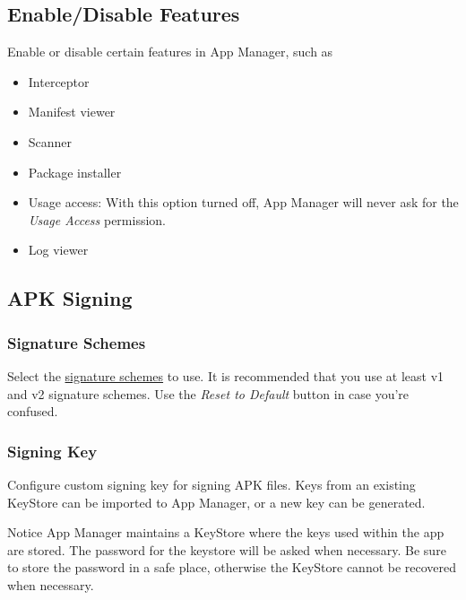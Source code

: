 \subsection{Enable/Disable Features}\label{subsec:enable/disable-features} %
Enable or disable certain features in App Manager, such as
\begin{itemize}
    \item Interceptor
    \item Manifest viewer
    \item Scanner
    \item Package installer
    \item Usage access: With this option turned off, App Manager will never ask for the \textit{Usage Access} permission.
    \item Log viewer
\end{itemize}

\subsection{APK Signing}\label{subsec:apk-signing} %

\subsubsection{Signature Schemes} %
Select the \href{https://source.android.com/security/apksigning}{signature schemes} to use.
It is recommended that you use at least v1 and v2 signature schemes.
Use the \textit{Reset to Default} button in case you're confused.

\subsubsection{Signing Key} %
Configure custom signing key for signing APK files.
Keys from an existing KeyStore can be imported to App Manager, or a new key can be generated.

\begin{warning}{Notice}
    App Manager maintains a KeyStore where the keys used within the app are stored.
    The password for the keystore will be asked when necessary.
    Be sure to store the password in a safe place, otherwise the KeyStore cannot be recovered when necessary.
\end{warning}

